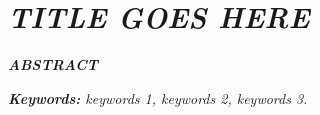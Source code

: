 \chapter*{\textit{TITLE GOES HERE}}
\begin{center}
	\vspace{0.5cm}
	\textbf{\textit{ABSTRACT}}
\end{center}
\qquad\textit{\lipsum[1]}

\noindent \textit{\textbf{Keywords:} keywords 1, keywords 2, keywords 3.}

\cleardoublepage
